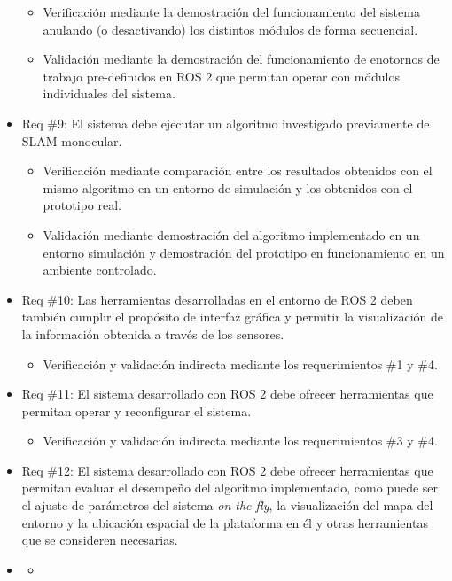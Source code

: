 \documentclass[
11pt, %
codirector, %
]{charter}
\begin{document}
\begin{itemize}
\begin{itemize}
		\item Verificación mediante la demostración del funcionamiento del sistema anulando (o desactivando) los distintos módulos de forma secuencial.
		\item Validación mediante la demostración del funcionamiento de enotornos de trabajo pre-definidos en ROS 2 que permitan operar con módulos individuales del sistema. 
	\end{itemize}
	\item Req \#9: El sistema debe ejecutar un algoritmo investigado previamente de SLAM monocular.
	\begin{itemize}
		\item Verificación mediante comparación entre los resultados obtenidos con el mismo algoritmo en un entorno de simulación y los obtenidos con el prototipo real.
		\item Validación mediante demostración del algoritmo implementado en un entorno simulación y demostración del prototipo en funcionamiento en un ambiente controlado.
	\end{itemize}
	\item Req \#10: Las herramientas desarrolladas en el entorno de ROS 2 deben también cumplir el propósito de interfaz gráfica y permitir la visualización de la información obtenida a través de los sensores.
	\begin{itemize}
		\item Verificación y validación indirecta mediante los requerimientos \#1 y \#4.
	\end{itemize}
	\item Req \#11: El sistema desarrollado con ROS 2 debe ofrecer herramientas que permitan operar y reconfigurar el sistema.
	\begin{itemize}
		\item Verificación y validación indirecta mediante los requerimientos \#3 y \#4.
	\end{itemize}
	\item Req \#12: El sistema desarrollado con ROS 2 debe ofrecer herramientas que permitan evaluar el desempeño del algoritmo implementado, como puede ser el ajuste de parámetros del sistema \textit{on-the-fly}, la visualización del mapa del entorno y la ubicación espacial de la plataforma en él y otras herramientas que se consideren necesarias.
	\item \begin{itemize}
		\item 
	\end{itemize}
\end{itemize}
\end{document}
